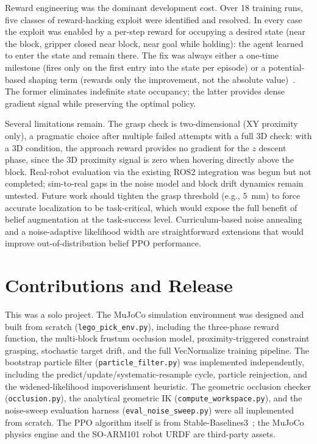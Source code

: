 \documentclass[conference]{IEEEtran}
\begin{document}
Reward engineering was the dominant development cost.
Over 18 training runs, five classes of reward-hacking exploit were
identified and resolved.
In every case the exploit was enabled by a per-step reward for occupying
a desired state (near the block, gripper closed near block, near goal
while holding): the agent learned to enter the state and remain there.
The fix was always either a one-time milestone (fires only on the first
entry into the state per episode) or a potential-based shaping term
(rewards only the improvement, not the absolute value)~\cite{ng1999potential}.
The former eliminates indefinite state occupancy; the latter provides dense
gradient signal while preserving the optimal policy.

Several limitations remain.
The grasp check is two-dimensional (XY proximity only), a pragmatic
choice after multiple failed attempts with a full $3$D check: with a
$3$D condition, the approach reward provides no gradient for the $z$
descent phase, since the $3$D proximity signal is zero when hovering
directly above the block.
Real-robot evaluation via the existing ROS2 integration was begun but
not completed; sim-to-real gaps in the noise model and block drift
dynamics remain untested.
Future work should tighten the grasp threshold (e.g., $5$~mm) to force
accurate localization to be task-critical, which would expose the full
benefit of belief augmentation at the task-success level.
Curriculum-based noise annealing and a noise-adaptive likelihood width
are straightforward extensions that would improve out-of-distribution
belief PPO performance.

\section*{Contributions and Release}

This was a solo project.
The MuJoCo simulation environment was designed and built from scratch
(\texttt{lego\_pick\_env.py}), including the three-phase reward function,
the multi-block frustum occlusion model, proximity-triggered constraint
grasping, stochastic target drift, and the full VecNormalize training
pipeline.
The bootstrap particle filter (\texttt{particle\_filter.py}) was implemented
independently, including the predict/update/systematic-resample cycle,
particle reinjection, and the widened-likelihood impoverishment heuristic.
The geometric occlusion checker (\texttt{occlusion.py}), the analytical
geometric IK (\texttt{compute\_workspace.py}), and the noise-sweep
evaluation harness (\texttt{eval\_noise\_sweep.py}) were all implemented
from scratch.
The PPO algorithm itself is from Stable-Baselines3~\cite{raffin2021sb3};
the MuJoCo physics engine and the SO-ARM101 robot URDF are third-party
assets.
\end{document}
